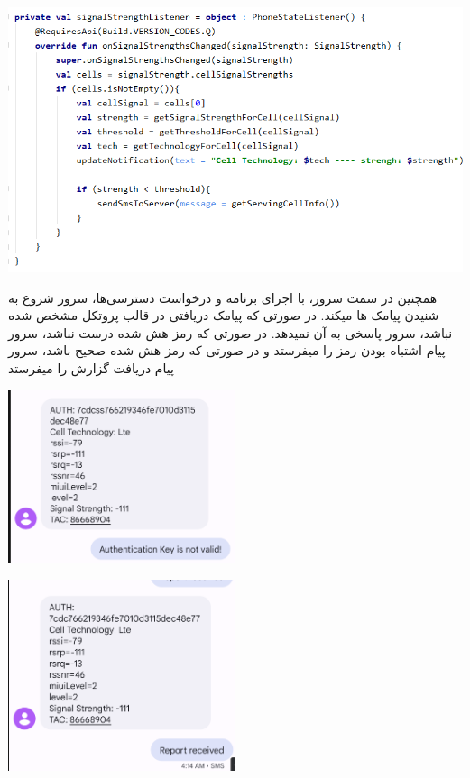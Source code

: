 \documentclass{article}
\begin{document}
\includegraphics[width=1\textwidth]{listen.png}\par\vspace{1cm}

همچنین در سمت سرور، با اجرای برنامه و درخواست دسترسی‌ها، سرور شروع به شنیدن پیامک ها میکند. در صورتی که پیامک دریافتی در قالب پروتکل مشخص شده نباشد، سرور پاسخی به آن نمیدهد. در صورتی که رمز هش شده درست نباشد، سرور پیام اشتباه بودن رمز را میفرستد و در صورتی که رمز هش شده صحیح باشد، سرور پیام دریافت گزارش را میفرستد
\singlespacing

\includegraphics[width=0.5\textwidth]{unauthorized.png}\par\vspace{1cm}
\includegraphics[width=0.5\textwidth]{report.png}\par\vspace{1cm}
\end{document}
